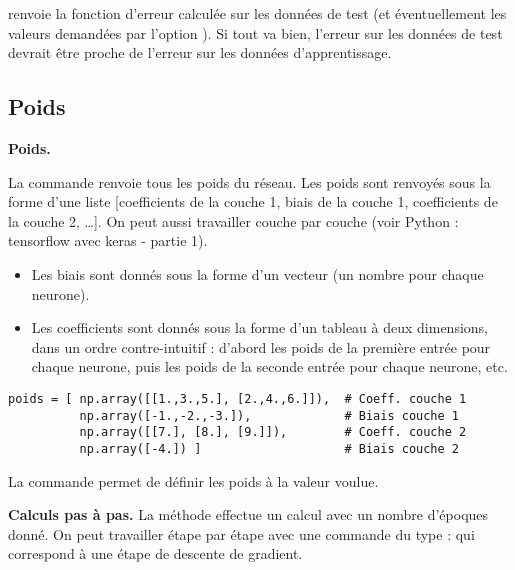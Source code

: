 \documentclass[11pt,class=report,crop=false]{standalone}
\begin{document}
renvoie la fonction d'erreur calculée sur les données de test (et éventuellement les valeurs demandées par l'option ).
Si tout va bien, l'erreur sur les données de test devrait être proche de l'erreur sur les données d'apprentissage.




\subsection{Poids}


\textbf{Poids.}

La commande  renvoie tous les poids du réseau.
Les poids sont renvoyés sous la forme d'une liste [coefficients de la couche 1, biais de la couche 1, coefficients de la couche 2, \ldots].
On peut aussi travailler couche par couche (voir \og{}Python : tensorflow avec keras - partie 1\fg{}).

\begin{itemize}
  \item Les biais sont donnés sous la forme d'un vecteur (un nombre pour chaque neurone).
  \item Les coefficients sont donnés sous la forme d'un tableau à deux dimensions, dans un ordre contre-intuitif : d'abord les poids de la première entrée pour chaque neurone, puis les poids de la seconde entrée pour chaque neurone, etc.
\end{itemize}

\begin{lstlisting}
poids = [ np.array([[1.,3.,5.], [2.,4.,6.]]),  # Coeff. couche 1
          np.array([-1.,-2.,-3.]),             # Biais couche 1                
          np.array([[7.], [8.], [9.]]),        # Coeff. couche 2
          np.array([-4.]) ]                    # Biais couche 2
\end{lstlisting}


La commande  permet de définir les poids à la valeur voulue.
  
\bigskip
\textbf{Calculs pas à pas.}
La méthode  effectue un calcul avec un nombre d'époques donné.
On peut travailler étape par étape avec une commande du type :
qui correspond à une étape de descente de gradient.
\end{document}
